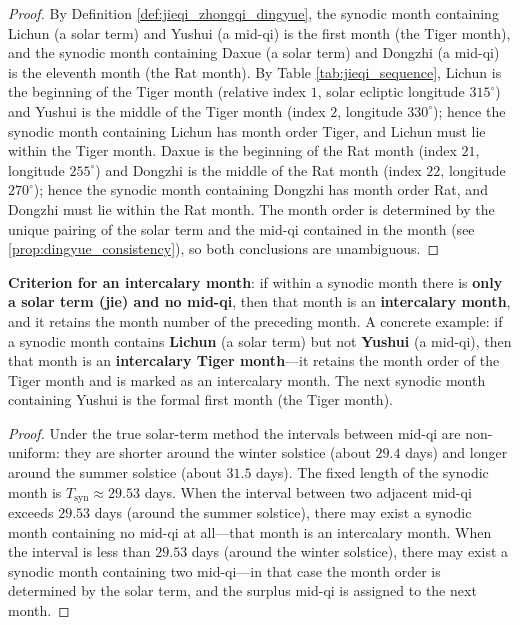 \begin{proof}
By Definition \ref{def:jieqi_zhongqi_dingyue}, the synodic month containing Lichun (a solar term) and Yushui (a mid-qi) is the first month (the Tiger month), and the synodic month containing Daxue (a solar term) and Dongzhi (a mid-qi) is the eleventh month (the Rat month). By Table \ref{tab:jieqi_sequence}, Lichun is the beginning of the Tiger month (relative index \(1\), solar ecliptic longitude \(315^\circ\)) and Yushui is the middle of the Tiger month (index \(2\), longitude \(330^\circ\)); hence the synodic month containing Lichun has month order Tiger, and Lichun must lie within the Tiger month. Daxue is the beginning of the Rat month (index \(21\), longitude \(255^\circ\)) and Dongzhi is the middle of the Rat month (index \(22\), longitude \(270^\circ\)); hence the synodic month containing Dongzhi has month order Rat, and Dongzhi must lie within the Rat month. The month order is determined by the unique pairing of the solar term and the mid-qi contained in the month (see \cref{prop:dingyue_consistency}), so both conclusions are unambiguous.
\end{proof}

\begin{proposition}\label{prop:wuzhongqi_run}
\textbf{Criterion for an intercalary month}: if within a synodic month there is \textbf{only a solar term (jie) and no mid-qi}, then that month is an \textbf{intercalary month}, and it retains the month number of the preceding month. A concrete example: if a synodic month contains \textbf{Lichun} (a solar term) but not \textbf{Yushui} (a mid-qi), then that month is an \textbf{intercalary Tiger month}---it retains the month order of the Tiger month and is marked as an intercalary month. The next synodic month containing Yushui is the formal first month (the Tiger month).
\end{proposition}

\begin{proof}
Under the true solar-term method the intervals between mid-qi are non-uniform: they are shorter around the winter solstice (about \(29.4\) days) and longer around the summer solstice (about \(31.5\) days). The fixed length of the synodic month is \(T_{\text{syn}}\approx 29.53\) days. When the interval between two adjacent mid-qi exceeds \(29.53\) days (around the summer solstice), there may exist a synodic month containing no mid-qi at all---that month is an intercalary month. When the interval is less than \(29.53\) days (around the winter solstice), there may exist a synodic month containing two mid-qi---in that case the month order is determined by the solar term, and the surplus mid-qi is assigned to the next month.
\end{proof}

